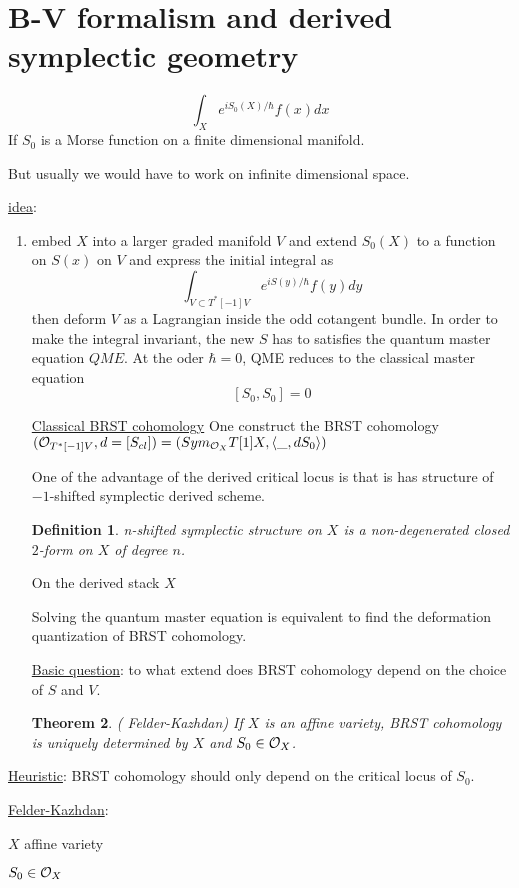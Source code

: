 \documentclass[11pt]{article}
\newtheorem{thm}{Theorem}[section]
\newtheorem{dfn}[thm]{Definition}
\newcommand{\calo}{{\cal O}}
\newcommand{\lgl}{\langle}
\newcommand{\rgl}{\rangle}
\begin{document}
\section{B-V formalism and derived symplectic geometry}
$$
\int_X e^{i S_0(X)/\hbar} f(x) dx
$$
If $S_0$ is a Morse function on a finite dimensional manifold.

But usually we would have to work on infinite dimensional space.

\underline{idea}: 
\begin{enumerate}
\item embed $X$ into a larger graded manifold $V$ and extend $S_0(X)$ to a function on $S(x)$ on $V$ and express the initial integral as
$$
\int_{V\subset T^*[-1]V} e^{i S(y)/\hbar}f(y) dy
$$
then deform $V$ as a Lagrangian inside the odd cotangent bundle. In order to make the integral invariant, the new $S$ has to satisfies the quantum master equation $QME$. At the oder $\hbar=0$, QME reduces to the classical master equation
$$
[S_{0},S_{0}]=0
$$ 

\underline{Classical BRST cohomology} One construct the BRST cohomology
$(\calo_{T^*[-1]V}, d=[S_{cl}])=(Sym_{\calo_X}T[1]X, \lgl\_,dS_0\rgl)$

One of the advantage of the derived critical locus is that is has structure of $-1$-shifted symplectic derived scheme.

\begin{dfn}
n-shifted symplectic structure on $X$ is a non-degenerated closed $2$-form on $X$ of degree $n$.
\end{dfn}

On the derived stack $X$

Solving the quantum master equation is equivalent to find the deformation quantization of BRST cohomology.

\underline{Basic question}: to what extend does BRST cohomology depend on the choice of $S$ and $V$.
\begin{thm}(
Felder-Kazhdan) If $X$ is an affine variety, BRST cohomology is uniquely determined by $X$ and $S_0\in \calo_X$. 
\end{thm}
\end{enumerate}

\underline{Heuristic}: BRST cohomology should only depend on the critical locus of $S_0$.

\underline{Felder-Kazhdan}: 

$X$ affine variety

$S_0\in\calo_X$
\end{document}
